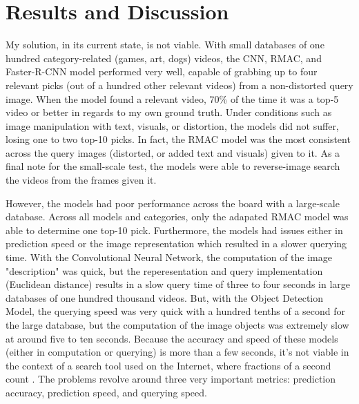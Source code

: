 \documentclass[10pt,twocolumn]{article}
\begin{document}
\section{Results and Discussion}

My solution, in its current state, is not viable. With small databases of one hundred category-related (games, art, dogs) videos, the CNN, RMAC, and Faster-R-CNN model performed very well, capable of grabbing up to four relevant picks (out of a hundred other relevant videos) from a non-distorted query image. When the model found a relevant video, 70\% of the time it was a top-5 video or better in regards to my own ground truth. Under conditions such as image manipulation with text, visuals, or distortion, the models did not suffer, losing one to two top-10 picks. In fact, the RMAC model was the most consistent across the query images (distorted, or added text and visuals) given to it. As a final note for the small-scale test, the models were able to reverse-image search the videos from the frames given it. 

However, the models had poor performance across the board with a large-scale database. Across all models and categories, only the adapated RMAC model was able to determine one top-10 pick. Furthermore, the models had issues either in prediction speed or the image representation which resulted in a slower querying time. With the Convolutional Neural Network, the computation of the image "description" was quick, but the reperesentation and query implementation (Euclidean distance) results in a slow query time of three to four seconds in large databases of one hundred thousand videos. But, with the Object Detection Model, the querying speed was very quick with a hundred tenths of a second for the large database, but the computation of the image objects was extremely slow at around five to ten seconds. Because the accuracy and speed of these models (either in computation or querying) is more than a few seconds, it's not viable in the context of a search tool used on the Internet, where fractions of a second count \cite{GOOGLE TODO}. The problems revolve around three very important metrics: prediction accuracy, prediction speed, and querying speed.
\end{document}
